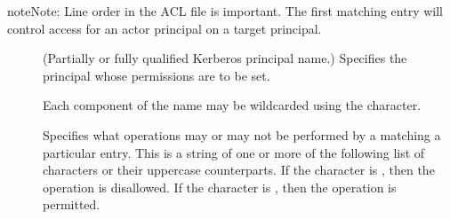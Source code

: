 \documentclass[letterpaper,10pt,english]{sphinxmanual}
\begin{document}
\begin{sphinxadmonition}{note}{Note:}
\sphinxAtStartPar
Line order in the ACL file is important.  The first matching entry
will control access for an actor principal on a target principal.
\end{sphinxadmonition}
\begin{description}
\item[{}] \leavevmode
\sphinxAtStartPar
(Partially or fully qualified Kerberos principal name.) Specifies
the principal whose permissions are to be set.

\sphinxAtStartPar
Each component of the name may be wildcarded using the \sphinxcode{\sphinxupquote{*}}
character.

\item[{}] \leavevmode
\sphinxAtStartPar
Specifies what operations may or may not be performed by a
 matching a particular entry.  This is a string of one or
more of the following list of characters or their upper\sphinxhyphen{}case
counterparts.  If the character is , then the operation
is disallowed.  If the character is , then the operation
is permitted.


\begin{savenotes}\sphinxattablestart
\centering
\begin{tabulary}{\linewidth}[t]{|T|T|}
\hline


\end{tabulary}
\end{savenotes}
\end{description}
\end{document}
